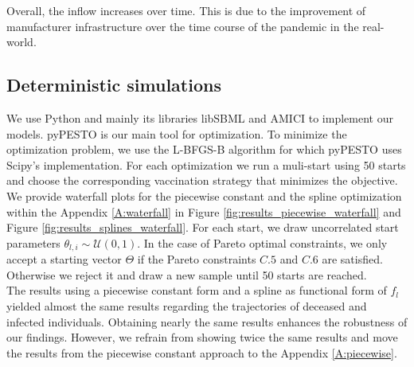 Overall, the inflow increases over time. This is due to the improvement of manufacturer infrastructure over the time course of the pandemic in the real-world.


\subsection{Deterministic simulations}
We use Python and mainly its libraries libSBML \citep{Bornstein.2008} and AMICI \citep{Frohlich.2020} to implement our models. pyPESTO \citep{pyPESTO} is our main tool for optimization. To minimize the optimization problem, we use the L-BFGS-B algorithm \citep{Zhu.1997} for which pyPESTO uses Scipy's \citep{scipy.2020} implementation. For each optimization we run a muli-start using 50 starts and choose the corresponding vaccination strategy that minimizes the objective. We provide waterfall plots for the piecewise constant and the spline optimization within the Appendix \ref{A:waterfall} in Figure \ref{fig:results_piecewise_waterfall} and Figure \ref{fig:results_splines_waterfall}. For each start, we draw uncorrelated start parameters $\theta_{l,i} \sim \mathcal{U}(0,1)$. In the case of Pareto optimal constraints, we only accept a starting vector $\Theta$ if the Pareto constraints $C.5$ and $C.6$ are satisfied. Otherwise we reject it and draw a new sample until 50 starts are reached.\\

The results using a piecewise constant form and a spline as functional form of $f_l$ yielded almost the same results regarding the trajectories of deceased and infected individuals. Obtaining nearly the same results enhances the robustness of our findings. However, we refrain from showing twice the same results and move the results from the piecewise constant approach to the Appendix \ref{A:piecewise}.  

